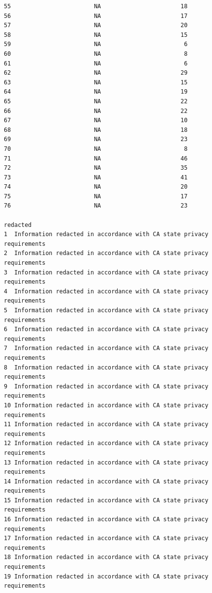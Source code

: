 \documentclass[
  letterpaper,
  DIV=11,
  numbers=noendperiod]{scrartcl}
\begin{document}
\begin{verbatim}
55                        NA                       18
56                        NA                       17
57                        NA                       20
58                        NA                       15
59                        NA                        6
60                        NA                        8
61                        NA                        6
62                        NA                       29
63                        NA                       15
64                        NA                       19
65                        NA                       22
66                        NA                       22
67                        NA                       10
68                        NA                       18
69                        NA                       23
70                        NA                        8
71                        NA                       46
72                        NA                       35
73                        NA                       41
74                        NA                       20
75                        NA                       17
76                        NA                       23
                                                                redacted
1  Information redacted in accordance with CA state privacy requirements
2  Information redacted in accordance with CA state privacy requirements
3  Information redacted in accordance with CA state privacy requirements
4  Information redacted in accordance with CA state privacy requirements
5  Information redacted in accordance with CA state privacy requirements
6  Information redacted in accordance with CA state privacy requirements
7  Information redacted in accordance with CA state privacy requirements
8  Information redacted in accordance with CA state privacy requirements
9  Information redacted in accordance with CA state privacy requirements
10 Information redacted in accordance with CA state privacy requirements
11 Information redacted in accordance with CA state privacy requirements
12 Information redacted in accordance with CA state privacy requirements
13 Information redacted in accordance with CA state privacy requirements
14 Information redacted in accordance with CA state privacy requirements
15 Information redacted in accordance with CA state privacy requirements
16 Information redacted in accordance with CA state privacy requirements
17 Information redacted in accordance with CA state privacy requirements
18 Information redacted in accordance with CA state privacy requirements
19 Information redacted in accordance with CA state privacy requirements

\end{verbatim}
\end{document}
